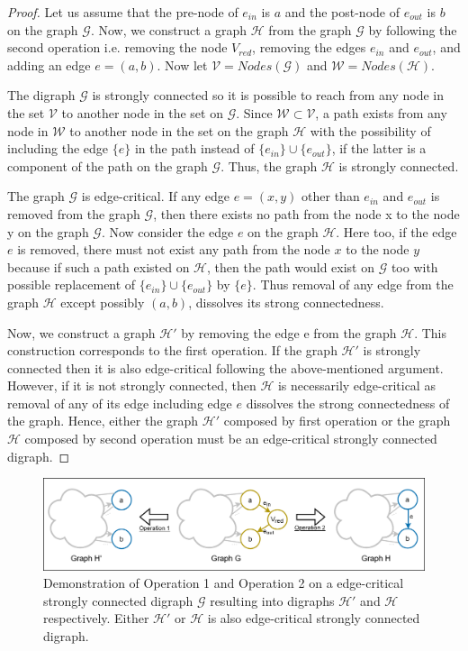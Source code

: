 \documentclass[runningheads]{llncs}
\begin{document}
\begin{proof}
Let us assume that the pre-node of $e_{in}$ is $a$ and the post-node of $e_{out}$ is $b$ on the graph $\mathcal{G}$. Now, we construct a graph $\mathcal{H}$ from the graph $\mathcal{G}$ by following the second operation i.e. removing the node $V_{red}$, removing the edges $e_{in}$ and $e_{out}$, and adding an edge $e = (a, b)$. Now let $\mathcal{V} = Nodes(\mathcal{G})$ and $\mathcal{W} = Nodes(\mathcal{H})$.

The digraph $\mathcal{G}$ is strongly connected so it is possible to reach from any node in the set $\mathcal{V}$ to another node in the set on $\mathcal{G}$. Since $\mathcal{W} \subset \mathcal{V}$, a path exists from any node in $\mathcal{W}$ to another node in the set on the graph $\mathcal{H}$ with the possibility of including the edge $\{e\}$ in the path instead of $\{e_{in}\} \cup \{e_{out}\}$, if the latter is a component of the path on the graph $\mathcal{G}$. Thus, the graph $\mathcal{H}$ is strongly connected.

The graph $\mathcal{G}$ is edge-critical. If any edge $e = (x, y)$ other than $e_{in}$ and $e_{out}$ is removed from the graph $\mathcal{G}$, then there exists no path from the node x to the node y on the graph $\mathcal{G}$. Now consider the edge $e$ on the graph $\mathcal{H}$. Here too, if the edge $e$ is removed, there must not exist any path from the node $x$ to the node $y$ because if such a path existed on $\mathcal{H}$, then the path would exist on $\mathcal{G}$ too with possible replacement of $\{e_{in}\} \cup \{e_{out}\}$ by $\{e\}$. Thus removal of any edge from the graph $\mathcal{H}$ except possibly $(a, b)$, dissolves its strong connectedness.

Now, we construct a graph $\mathcal{H'}$ by removing the edge {e} from the graph $\mathcal{H}$. This construction corresponds to the first operation. If the graph $\mathcal{H'}$ is strongly connected then it is also edge-critical following the above-mentioned argument. However, if it is not strongly connected, then $\mathcal{H}$ is necessarily edge-critical as removal of any of its edge including edge $e$ dissolves the strong connectedness of the graph. Hence, either the graph $\mathcal{H'}$ composed by first operation or the graph $\mathcal{H}$ composed by second operation must be an edge-critical strongly connected digraph.
\end{proof}

\begin{figure}[ht]
    \centering
    \includegraphics[width=\textwidth]{fig4_b.png}
    \caption{Demonstration of Operation 1 and Operation 2 on a edge-critical strongly connected digraph $\mathcal{G}$ resulting into digraphs $\mathcal{H'}$ and $\mathcal{H}$ respectively. Either $\mathcal{H'}$ or $\mathcal{H}$ is also edge-critical strongly connected digraph.}
    \label{fig:fig4}
\end{figure}
\end{document}
